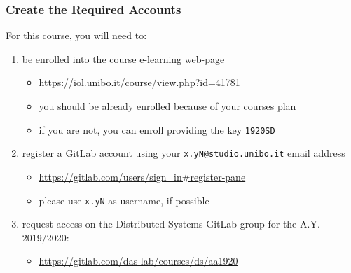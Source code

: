 \documentclass[handout]{beamer}\mode<presentation>{\usetheme{AMSCesenaPurpleAndGold}}
\begin{document}
\begin{frame}\label{configure-accounts}
\frametitle{Create the Required Accounts}
    
    For this course, you will need to:
    \begin{enumerate}
        \item be enrolled into the course e-learning web-page
        \begin{itemize}
            \item \url{https://iol.unibo.it/course/view.php?id=41781}
            \item you should be already enrolled because of your courses plan
            \item if you are not, you can enroll providing the key \alert{\texttt{1920SD}}
        \end{itemize}
        
        \item register a GitLab account using your \alert{\texttt{x.yN@studio.unibo.it}} email address
        \begin{itemize}
            \item \url{https://gitlab.com/users/sign_in\#register-pane}
            \item please use \texttt{x.yN} as username, if possible
        \end{itemize}
        
        
        \item request access on the Distributed Systems GitLab group for the A.Y. 2019/2020:
        \begin{itemize}
            \item \url{https://gitlab.com/das-lab/courses/ds/aa1920}
        \end{itemize}
        
    \end{enumerate}
    
\end{frame}
\end{document}
